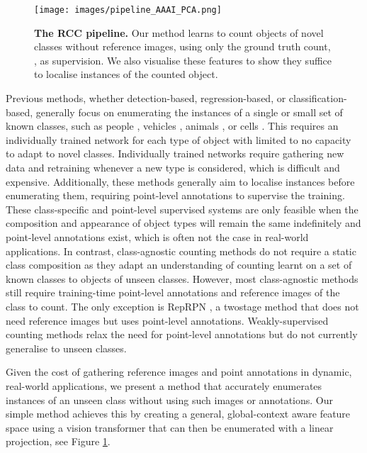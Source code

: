 \documentclass[letterpaper, 11pt]{IEEEtran}
\begin{document}
    \begin{figure}[t]
    \centering
    \texttt{[image: images/pipeline\_AAAI\_PCA.png]}
        \caption{
    \textbf{The RCC pipeline.} 
    Our method learns to count objects of novel classes without reference images, using only the ground truth count, , as supervision.
    We also visualise these features to show they suffice to  localise instances of the counted object.
    }
    \label{pipeline}
\end{figure}
    
    Previous methods, whether detection-based, regression-based, or classification-based, generally focus on enumerating the instances of a single or small set of known classes, such as people \cite{wang2015deep, cao2018scale},
    vehicles \cite{mundhenk2016large},
    animals \cite{go2021fine}, 
    or
    cells \cite{xie2018microscopy}.
    This requires an individually trained network for each type of object with limited to no capacity to adapt to novel classes.
    Individually trained networks require gathering new data and retraining whenever a new type is considered, which is difficult and expensive.  
    Additionally, these methods generally aim to localise instances before enumerating them, requiring point-level annotations to supervise the training. 
    These class-specific and point-level supervised systems are only feasible when the composition and appearance of object types will remain the same indefinitely and point-level annotations exist, which is often not the case in real-world applications. 
    In contrast, class-agnostic counting methods \cite{Lu18, ranjan2021Famnet} do not require a static class composition as they adapt an understanding of counting learnt on a set of known classes to objects of unseen classes.
    However, most class-agnostic methods still require training-time point-level annotations and reference images of the class to count. The only exception is RepRPN \cite{ranjan2022exemplar}, a twostage method that does not need reference images but uses point-level annotations.
    Weakly-supervised counting methods \cite{lei2021towards, yang2020weakly} relax the need for point-level annotations but do not currently generalise to unseen classes.

    Given the cost of gathering reference images and point annotations in dynamic, real-world applications, we present a method that accurately enumerates instances of an unseen class without using such images or annotations. Our simple method achieves this by creating a general, global-context aware feature space using a vision transformer that can then be enumerated with a linear projection, see Figure \ref{pipeline}.
\end{document}
